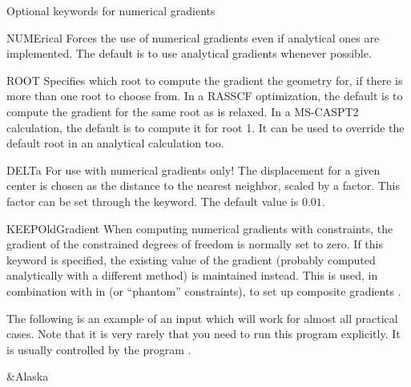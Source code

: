 Optional keywords for numerical gradients
\begin{keywordlist}
\item[NUMErical]
Forces the use of numerical gradients even if analytical ones
are implemented. The default is to use analytical gradients whenever
possible.
\item[ROOT]
Specifies which root to compute the gradient the geometry for, if there is more than
one root to choose from. In a RASSCF optimization, the default is to
compute the gradient for the same root as is relaxed. In a MS-CASPT2 calculation, the
default is to compute it for root 1. It can be used to override the default
root in an analytical calculation too.
\item[DELTa]
For use with numerical gradients only!
The displacement for a given center is chosen as the distance to the nearest
neighbor, scaled by a factor. This factor can be set through the 
keyword. The default value is $0.01$.
\item[KEEPOldGradient]
When computing numerical gradients with constraints, the gradient of the constrained degrees
of freedom is normally set to zero. If this keyword is specified, the existing value of the gradient
(probably computed analytically with a different method) is maintained instead.
This is used, in combination with  in  (or ``phantom''
constraints), to set up composite gradients \cite{Stenrup2015}.
\end{keywordlist}

The following is an example of an input which will work for
almost all practical cases. Note that it is very rarely that you need to run
this program explicitly. It is usually controlled by the program
.

\begin{inputlisting}
 &Alaska
\end{inputlisting}
